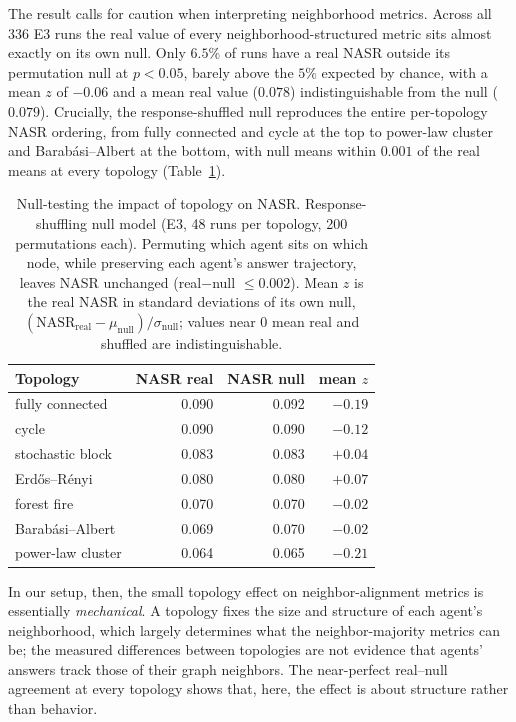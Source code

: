 \documentclass[letterpaper]{article} %
\begin{document}
The result calls for caution when interpreting neighborhood metrics. Across all 336 E3 runs the real value of every neighborhood-structured metric sits almost exactly on its own null. Only $6.5\%$ of runs have a real NASR outside its permutation null at $p < 0.05$, barely above the $5\%$ expected by chance, with a mean $z$ of $-0.06$ and a mean real value ($0.078$) indistinguishable from the null ($0.079$).
Crucially, the response-shuffled null reproduces the entire per-topology NASR ordering, from fully connected and cycle at the top to power-law cluster and Barab\'asi--Albert at the bottom, with null means within $0.001$ of the real means at every topology (Table~\ref{tab:null}).

\begin{table}[t]
\centering
\small
\setlength{\tabcolsep}{4pt}
\begin{tabular}{lrrr}
\toprule
Topology & NASR real & NASR null & mean $z$ \\
\midrule
fully connected & 0.090 & 0.092 & $-0.19$ \\
cycle & 0.090 & 0.090 & $-0.12$ \\
stochastic block & 0.083 & 0.083 & $+0.04$ \\
Erd\H{o}s--R\'enyi & 0.080 & 0.080 & $+0.07$ \\
forest fire & 0.070 & 0.070 & $-0.02$ \\
Barab\'asi--Albert & 0.069 & 0.070 & $-0.02$ \\
power-law cluster & 0.064 & 0.065 & $-0.21$ \\
\bottomrule
\end{tabular}
\caption{Null-testing the impact of topology on NASR. Response-shuffling null model (E3, 48 runs per topology, 200 permutations each). Permuting which agent sits on which node, while preserving each agent's answer trajectory, leaves NASR unchanged (real$-$null $\leq 0.002$). Mean $z$ is the real NASR in standard deviations of its own null, $(\text{NASR}_{\text{real}} - \mu_{\text{null}})/\sigma_{\text{null}}$; values near $0$ mean real and shuffled are indistinguishable.}
\label{tab:null}
\end{table}

In our setup, then, the small topology effect on neighbor-alignment metrics is essentially \emph{mechanical}. A topology fixes the size and structure of each agent's neighborhood, which largely determines what the neighbor-majority metrics can be; the measured differences between topologies are not evidence that agents' answers track those of their graph neighbors. The near-perfect real--null agreement at every topology shows that, here, the effect is about structure rather than behavior.
\end{document}
